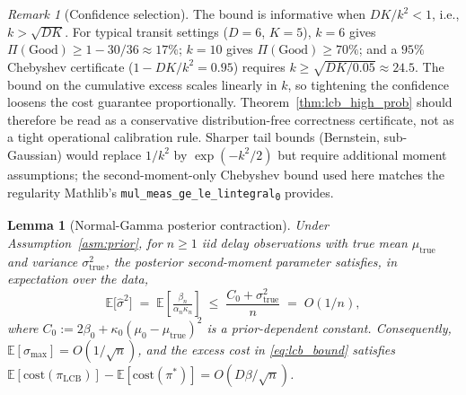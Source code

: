 \documentclass[11pt]{article}
\newtheorem{lemma}[theorem]{Lemma}
\theoremstyle{definition}
\theoremstyle{remark}
\newtheorem{remark}{Remark}
\begin{document}
\begin{remark}[Confidence selection]\label{rem:k_selection}
The bound is informative when $DK/k^2 < 1$, i.e.,
$k > \sqrt{DK}$. For typical transit settings ($D=6$, $K=5$),
$k = 6$ gives $\Pi(\mathrm{Good}) \geq 1 - 30/36 \approx 17\%$;
$k = 10$ gives $\Pi(\mathrm{Good}) \geq 70\%$; and a $95\%$
Chebyshev certificate ($1 - DK/k^2 = 0.95$) requires
$k \geq \sqrt{DK / 0.05} \approx 24.5$. The bound on the cumulative
excess scales linearly in $k$, so tightening the confidence loosens
the cost guarantee proportionally. Theorem~\ref{thm:lcb_high_prob}
should therefore be read as a conservative distribution-free
correctness certificate, not as a tight operational calibration
rule. Sharper tail bounds (Bernstein, sub-Gaussian) would replace
$1/k^2$ by $\exp(-k^2/2)$ but require additional moment assumptions;
the second-moment-only Chebyshev bound used here matches the
regularity Mathlib's
\texttt{mul\_meas\_ge\_le\_lintegral\textsubscript{0}} provides.
\end{remark}

\begin{lemma}[Normal-Gamma posterior contraction]\label{lem:contraction}
Under Assumption~\ref{asm:prior}, for $n\geq 1$ iid delay observations
with true mean $\mu_{\mathrm{true}}$ and variance $\sigma_{\mathrm{true}}^2$,
the posterior second-moment parameter satisfies, in expectation over
the data,
\[
\mathbb{E}\bigl[\hat\sigma^2\bigr]
\;=\;\mathbb{E}\!\left[\tfrac{\beta_n}{\alpha_n\kappa_n}\right]
\;\leq\; \frac{C_0 + \sigma_{\mathrm{true}}^2}{n}
\;=\; O(1/n),
\]
where $C_0 := 2\beta_0 + \kappa_0(\mu_0-\mu_{\mathrm{true}})^2$ is a
prior-dependent constant.
Consequently, $\mathbb{E}[\sigma_{\max}] = O(1/\sqrt{n})$, and the
excess cost in \eqref{eq:lcb_bound} satisfies
$\mathbb{E}[\mathrm{cost}(\pi_{\mathrm{LCB}})] - \mathbb{E}[\mathrm{cost}(\pi^*)] = O(D\beta/\sqrt{n})$.
\end{lemma}
\end{document}
